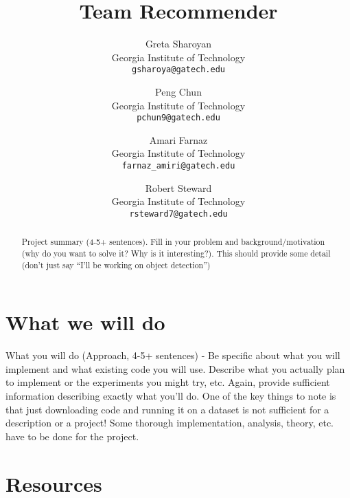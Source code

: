 \documentclass[10pt,twocolumn,letterpaper]{article}
\begin{document}
\title{Team Recommender}

\author{Greta Sharoyan\\
Georgia Institute of Technology\\
{\tt\small gsharoya@gatech.edu}
\and
Peng Chun\\
Georgia Institute of Technology\\
{\tt\small pchun9@gatech.edu}\\
\and
Amari Farnaz\\
Georgia Institute of Technology\\
{\tt\small farnaz\_amiri@gatech.edu}
\and
Robert Steward\\
Georgia Institute of Technology\\
{\tt\small rsteward7@gatech.edu}
}

\maketitle

\begin{abstract}
   Project summary (4-5+ sentences). Fill in your problem and background/motivation (why do you want to solve it? Why is it interesting?). This should provide some detail (don’t just say “I’ll be working on object detection”)
\end{abstract}

\section{What we will do}
What you will do (Approach, 4-5+ sentences) - Be specific about what you will implement and what existing code you will use. Describe what you actually plan to implement or the experiments you might try, etc. Again, provide sufficient information describing exactly what you’ll do. One of the key things to note is that just downloading code and running it on a dataset is not sufficient for a description or a project! Some thorough implementation, analysis, theory, etc. have to be done for the project.

\section{Resources}
\end{document}
